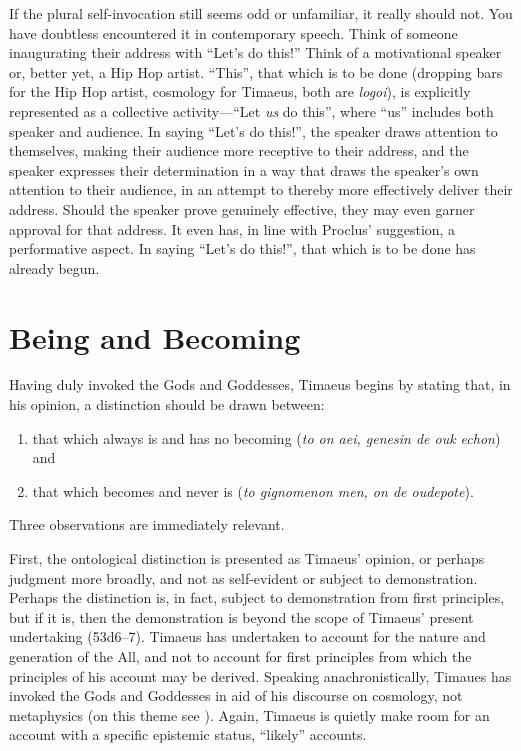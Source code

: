 If the plural self-invocation still seems odd or unfamiliar, it really should not. You have doubtless encountered it in contemporary speech. Think of someone inaugurating their address with ``Let's do this!'' Think of a motivational speaker or, better yet, a Hip Hop artist. ``This'', that which is to be done (dropping bars for the Hip Hop artist, cosmology for Timaeus, both are \emph{logoi}), is explicitly represented as a collective activity---``Let \emph{us} do this'', where ``us'' includes both speaker and audience. In saying ``Let's do this!'', the speaker draws attention to themselves, making their audience more receptive to their address, and the speaker expresses their determination in a way that draws the speaker's own attention to their audience, in an attempt to thereby more effectively deliver their address. Should the speaker prove genuinely effective, they may even garner approval for that address. It even has, in line with Proclus' suggestion, a performative aspect. In saying ``Let's do this!'', that which is to be done has already begun.


\section{Being and Becoming} %
\label{sec:Being and Becoming}

Having duly invoked the Gods and Goddesses, Timaeus begins by stating that, in his opinion, a distinction should be drawn between: 
\begin{enumerate}[(1)]
	\item that which always is and has no becoming (\emph{to on aei, genesin de ouk echon}) and
	\item that which becomes and never is (\emph{to gignomenon men, on de oudepote}).
\end{enumerate}
Three observations are immediately relevant. 

First, the ontological distinction is presented as Timaeus' opinion, or perhaps judgment more broadly, and not as self-evident or subject to demonstration. Perhaps the distinction is, in fact, subject to demonstration from first principles, but if it is, then the demonstration is beyond the scope of Timaeus' present undertaking (53d6--7). Timaeus has undertaken to account for the nature and generation of the All, and not to account for first principles from which the principles of his account may be derived. Speaking anachronistically, Timaues has invoked the Gods and Goddesses in aid of his discourse on cosmology, not metaphysics (on this theme see \citealt{Broadie:2012vl}). Again, Timaeus is quietly make room for an account with a specific epistemic status, ``likely'' accounts.

